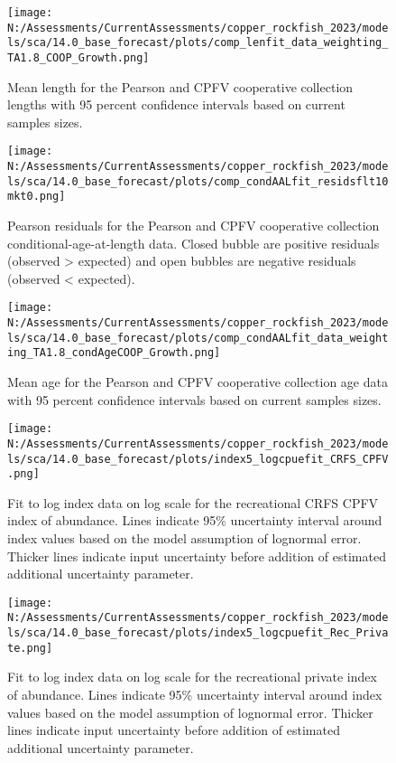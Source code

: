 \documentclass[11pt,
  english,
  letterpaper,
]{article}
\begin{document}
\begin{figure}
\centering
\texttt{[image: N:/Assessments/CurrentAssessments/copper\_rockfish\_2023/models/sca/14.0\_base\_forecast/plots/comp\_lenfit\_data\_weighting\_TA1.8\_COOP\_Growth.png]}
\caption{Mean length for the Pearson and CPFV cooperative collection lengths with 95 percent confidence intervals based on current samples sizes.\label{fig:coop-mean-len-fit}}
\end{figure}

\pagebreak

\begin{figure}
\centering
\texttt{[image: N:/Assessments/CurrentAssessments/copper\_rockfish\_2023/models/sca/14.0\_base\_forecast/plots/comp\_condAALfit\_residsflt10mkt0.png]}
\caption{Pearson residuals for the Pearson and CPFV cooperative collection conditional-age-at-length data. Closed bubble are positive residuals (observed \textgreater{} expected) and open bubbles are negative residuals (observed \textless{} expected).\label{fig:coop-age-pearson}}
\end{figure}

\pagebreak

\begin{figure}
\centering
\texttt{[image: N:/Assessments/CurrentAssessments/copper\_rockfish\_2023/models/sca/14.0\_base\_forecast/plots/comp\_condAALfit\_data\_weighting\_TA1.8\_condAgeCOOP\_Growth.png]}
\caption{Mean age for the Pearson and CPFV cooperative collection age data with 95 percent confidence intervals based on current samples sizes.\label{fig:coop-mean-age-fit}}
\end{figure}

\pagebreak

\begin{figure}
\centering
\texttt{[image: N:/Assessments/CurrentAssessments/copper\_rockfish\_2023/models/sca/14.0\_base\_forecast/plots/index5\_logcpuefit\_CRFS\_CPFV.png]}
\caption{Fit to log index data on log scale for the recreational CRFS CPFV index of abundance. Lines indicate 95\% uncertainty interval around index values based on the model assumption of lognormal error. Thicker lines indicate input uncertainty before addition of estimated additional uncertainty parameter.\label{fig:crfs-cpfv-index-fit}}
\end{figure}

\pagebreak

\begin{figure}
\centering
\texttt{[image: N:/Assessments/CurrentAssessments/copper\_rockfish\_2023/models/sca/14.0\_base\_forecast/plots/index5\_logcpuefit\_Rec\_Private.png]}
\caption{Fit to log index data on log scale for the recreational private index of abundance. Lines indicate 95\% uncertainty interval around index values based on the model assumption of lognormal error. Thicker lines indicate input uncertainty before addition of estimated additional uncertainty parameter.\label{fig:crfs-pr-index-fit}}
\end{figure}
\end{document}
